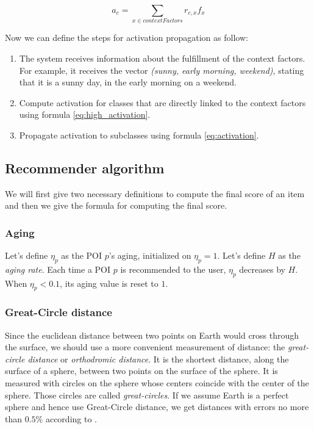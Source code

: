 \begin{equation} \label{eq:high_activation}
    a_c = \sum_{x \in contextFactors} r_{c,x} f_x
\end{equation}

Now we can define the steps for activation propagation as follow:
\begin{enumerate}
    \item The system receives information about the fulfillment of the context factors. For example, it receives the vector \textit{(sunny, early morning, weekend)}, stating that it is a sunny day, in the early morning on a weekend.
    
    \item Compute activation for classes that are directly linked to the context factors using formula \ref{eq:high_activation}.
    
    \item Propagate activation to subclasses using formula \ref{eq:activation}.
\end{enumerate}

\subsection{Recommender algorithm}

We will first give two necessary definitions to compute the final score of an item and then we give the formula for computing the final score.

\subsubsection{Aging}

Let's define $\eta_p$ as the POI $p$'s aging, initialized on $\eta_p = 1$. Let's define $H$ as the \textit{aging rate}. Each time a POI $p$ is recommended to the user, $\eta_p$ decreases by $H$. When $\eta_p < 0.1$, its aging value is reset to $1$. 

\subsubsection{Great-Circle distance}
Since the euclidean distance between two points on Earth would cross through the surface, we should use a more convenient measurement of distance: the \textit{great-circle distance} or \textit{orthodromic distance}. It is the shortest distance, along the surface of a sphere, between two points on the surface of the sphere. It is measured with circles on the sphere whose centers coincide with the center of the sphere. Those circles are called \textit{great-circles}. If we assume Earth is a perfect sphere and hence use Great-Circle distance, we get distances with errors no more than $0.5\%$ according to \cite{1997admiralty}. 

